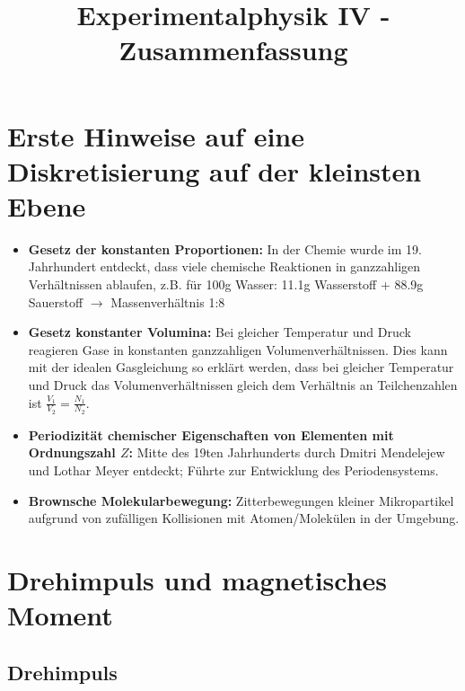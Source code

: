 \documentclass[twocolumn]{summery_4.1}
\title{Experimentalphysik IV - Zusammenfassung}
\begin{document}
\maketitle
\tableofcontents

\section{Erste Hinweise auf eine Diskretisierung auf der kleinsten Ebene}
\begin{itemize}
    \item \textbf{Gesetz der konstanten Proportionen:} In der Chemie wurde im 19. Jahrhundert entdeckt, dass viele chemische Reaktionen in ganzzahligen Verhältnissen ablaufen, z.B. für 100g Wasser: 11.1g Wasserstoff + 88.9g Sauerstoff $\to$ Massenverhältnis 1:8 
    \item \textbf{Gesetz konstanter Volumina:} Bei gleicher Temperatur und Druck reagieren Gase in konstanten ganzzahligen Volumenverhältnissen. Dies kann mit der idealen Gasgleichung so erklärt werden, dass bei gleicher Temperatur und Druck das  Volumenverhältnissen gleich dem Verhältnis an Teilchenzahlen ist $\frac{V_1}{V_2} = \frac{N_1}{N_2}$.
    \item\textbf{Periodizität chemischer Eigenschaften von Elementen mit Ordnungszahl $Z$:} Mitte des 19ten Jahrhunderts durch Dmitri Mendelejew und Lothar
    Meyer entdeckt; Führte zur Entwicklung des Periodensystems.
    \item\textbf{Brownsche Molekularbewegung:} Zitterbewegungen kleiner Mikropartikel aufgrund von zufälligen Kollisionen mit Atomen/Molekülen in der Umgebung.
\end{itemize}

\onecolumn
\section{Drehimpuls und magnetisches Moment}
\subsection{Drehimpuls}
\end{document}

